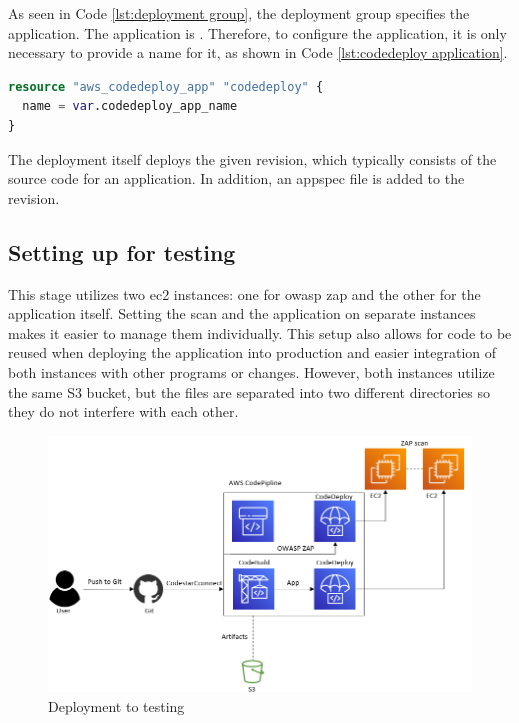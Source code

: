 As seen in Code \ref{lst:deployment group}, the deployment group specifies the application. The application is \textit{} \cite{CodeDeployApplication}. Therefore, to configure the application, it is only necessary to provide a name for it, as shown in Code \ref{lst:codedeploy application}.

\vspace{2mm}
\begin{lstlisting}[language=terraform, caption=Create an application for the deployment, captionpos=b, frame=single, label= lst:codedeploy application]
resource "aws_codedeploy_app" "codedeploy" {
  name = var.codedeploy_app_name
}
\end{lstlisting}

The deployment itself deploys the given revision, which typically consists of the source code for an application. In addition, an \gls{appspec} file is added to the revision. 

\subsection{Setting up for testing}

This stage utilizes two \acrshort{ec2} instances: one for \acrshort{owasp} \acrshort{zap} and the other for the application itself. Setting the scan and the application on separate instances makes it easier to manage them individually. This setup also allows for code to be reused when deploying the application into production and easier integration of both instances with other programs or changes. However, both instances utilize the same S3 bucket, but the files are separated into two different directories so they do not interfere with each other.

\vspace{2mm}
\begin{figure}[H]
    \centering
    \includegraphics[width=0.6\columnwidth]{Images/aws-piplin-5.png}
    \caption{Deployment to testing}
    \label{fig: Deployment to testing}
\end{figure}

